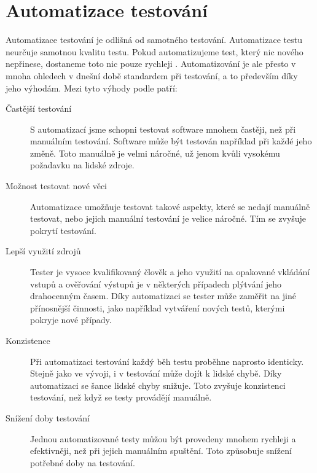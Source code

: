 \section{Automatizace testování}

Automatizace testování je odlišná od samotného testování. Automatizace testu neurčuje samotnou kvalitu testu. Pokud automatizujeme test, který nic nového nepřinese, dostaneme toto nic pouze rychleji \cite{fewster1999software}. Automatizování je ale přesto v mnoha ohledech v dnešní době standardem při testování, a to především díky jeho výhodám. Mezi tyto výhody podle \cite{fewster1999software} patří:

\begin{description}
    \item[Častější testování] S automatizací jsme schopni testovat software mnohem častěji, než při manuálním testování. Software může být testován například při každé jeho změně. Toto manuálně je velmi náročné, už jenom kvůli vysokému požadavku na lidské zdroje.  
    \item[Možnost testovat nové věci] Automatizace umožňuje testovat takové aspekty, které se nedají manuálně testovat, nebo jejich manuální testování je velice náročné. Tím se zvyšuje pokrytí testování.
    \item[Lepší využití zdrojů] Tester je vysoce kvalifikovaný člověk a jeho využití na opakované vkládání vstupů a ověřování výstupů je v některých případech plýtvání jeho drahocenným časem. Díky automatizaci se tester může zaměřit na jiné přínosnější činnosti, jako například vytváření nových testů, kterými pokryje nové případy.
    \item[Konzistence] Při automatizaci testování každý běh testu proběhne naprosto identicky. Stejně jako ve vývoji, i v testování může dojít k lidské chybě. Díky automatizaci se šance lidské chyby snižuje. Toto zvyšuje konzistenci testování, než když se testy provádějí manuálně.
    \item[Snížení doby testování] Jednou automatizované testy můžou být provedeny mnohem rychleji a efektivněji, než při jejich manuálním spuštění. Toto způsobuje snížení potřebné doby na testování.
\end{description}